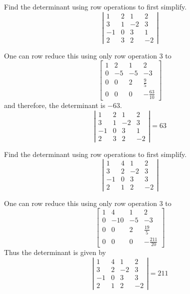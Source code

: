 \documentclass{ximera}
\begin{document}
\begin{problem}\label{prb:7.24} Find the determinant using row operations to first simplify.
\begin{equation*}
\left|
\begin{array}{rrrr}
1 & 2 & 1 & 2 \\
3 & 1 & -2 & 3 \\
-1 & 0 & 3 & 1 \\
2 & 3 & 2 & -2
\end{array}
\right|
\end{equation*}
\begin{hint}
One can row reduce this using only row operation 3 to
\[
\left[
\begin{array}{rrrr}
1 & 2 & 1 & 2 \\
0 & -5 & -5 & -3 \\
0 & 0 & 2 & \frac{9}{5} \\
0 & 0 & 0 & -\frac{63}{10}
\end{array}
\right]
\]
and therefore, the determinant is $-63.$
\[
\left|
\begin{array}{rrrr}
1 & 2 & 1 & 2 \\
3 & 1 & -2 & 3 \\
-1 & 0 & 3 & 1 \\
2 & 3 & 2 & -2
\end{array}
\right| = 63
\]
\end{hint}
\end{problem}

\begin{problem}\label{prb:7.25} Find the determinant using row operations to first simplify.
\begin{equation*}
\left|
\begin{array}{rrrr}
1 & 4 & 1 & 2 \\
3 & 2 & -2 & 3 \\
-1 & 0 & 3 & 3 \\
2 & 1 & 2 & -2
\end{array}
\right|
\end{equation*}
\begin{hint}
One can row reduce this using only row operation 3 to$\allowbreak $%
\[
\left[
\begin{array}{rrrr}
1 & 4 & 1 & 2 \\
0 & -10 & -5 & -3 \\
0 & 0 & 2 & \frac{19}{5} \\
0 & 0 & 0 & -\frac{211}{20}
\end{array}
\right]
\]
Thus the determinant is given by
\[
\left|
\begin{array}{rrrr}
1 & 4 & 1 & 2 \\
3 & 2 & -2 & 3 \\
-1 & 0 & 3 & 3 \\
2 & 1 & 2 & -2
\end{array}
\right| = 211
\]
\end{hint}
\end{problem}
\end{document}
